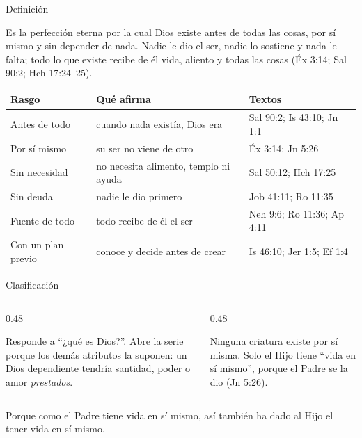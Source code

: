 \begin{frame}{Definición}
\begin{tcolorbox}[colback=papiro,colframe=azul,boxrule=1pt,arc=3pt,fonttitle=\bfseries,title=La preexistencia de Dios]
\small Es la perfección eterna por la cual Dios existe antes de todas las cosas, por sí mismo y sin depender de nada. Nadie le dio el ser, nadie lo sostiene y nada le falta; todo lo que existe recibe de él vida, aliento y todas las cosas (Éx 3:14; Sal 90:2; Hch 17:24--25).
\end{tcolorbox}
\scriptsize\renewcommand{\arraystretch}{1.1}
\begin{tabular}{@{}>{\RaggedRight\arraybackslash}p{2.6cm}>{\RaggedRight\arraybackslash}p{5.4cm}>{\RaggedRight\arraybackslash}p{3.6cm}@{}}
\toprule
\textbf{Rasgo} & \textbf{Qué afirma} & \textbf{Textos} \\ \midrule
Antes de todo & cuando nada existía, Dios era & Sal 90:2; Is 43:10; Jn 1:1 \\
Por sí mismo & su ser no viene de otro & Éx 3:14; Jn 5:26 \\
Sin necesidad & no necesita alimento, templo ni ayuda & Sal 50:12; Hch 17:25 \\
Sin deuda & nadie le dio primero & Job 41:11; Ro 11:35 \\
Fuente de todo & todo recibe de él el ser & Neh 9:6; Ro 11:36; Ap 4:11 \\
Con un plan previo & conoce y decide antes de crear & Is 46:10; Jer 1:5; Ef 1:4 \\
\bottomrule
\end{tabular}
\end{frame}

\begin{frame}{Clasificación}
\begin{columns}[c,onlytextwidth]
\begin{column}{0.48\textwidth}
\begin{tcolorbox}[colback=azul!8!papiro,colframe=azul,boxrule=0.8pt,arc=3pt,title=Ser,fonttitle=\bfseries\small]
\small Responde a ``¿qué es Dios?''. Abre la serie porque los demás atributos la suponen: un Dios dependiente tendría santidad, poder o amor \emph{prestados}.
\end{tcolorbox}
\end{column}
\begin{column}{0.48\textwidth}
\begin{tcolorbox}[colback=dorado!12,colframe=dorado,boxrule=0.8pt,arc=3pt,title=Incomunicable,fonttitle=\bfseries\small,coltitle=azuloscuro]
\small Ninguna criatura existe por sí misma. Solo el Hijo tiene ``vida en sí mismo'', porque el Padre se la dio (Jn 5:26).
\end{tcolorbox}
\end{column}
\end{columns}\medskip
\begin{cita}Porque como el Padre tiene vida en sí mismo, así también ha dado al Hijo el tener vida en sí mismo.\end{cita}
\end{frame}

